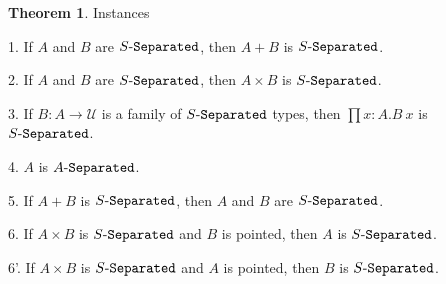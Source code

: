 \documentclass[11pt]{article}
\theoremstyle{definition}
\newtheorem{theorem}{Theorem}[section]
\renewcommand{\(}{\left(}
\renewcommand{\)}{\right)}
\newcommand{\U}{\mathcal{U}}
\newcommand{\apl}[2]{#1\ #2}
\newcommand{\dprod}[2]{\prod #1.#2}
\newcommand{\prodt}[2]{#1 \times #2}
\begin{document}
\begin{theorem} Instances

1. If $A$ and $B$ are $\Separated{S}$, then $A + B$ is $\Separated{S}$.

2. If $A$ and $B$ are $\Separated{S}$, then $\prodt{A}{B}$ is $\Separated{S}$.

3. If $B : A \to \U$ is a family of $\Separated{S}$ types, then $\dprod{x : A}{\apl{B}{x}}$ is $\Separated{S}$.

4. $A$ is $\Separated{A}$.

5. If $A + B$ is $\Separated{S}$, then $A$ and $B$ are $\Separated{S}$.

6. If $\prodt{A}{B}$ is $\Separated{S}$ and $B$ is pointed, then $A$ is $\Separated{S}$.

6'. If $\prodt{A}{B}$ is $\Separated{S}$ and $A$ is pointed, then $B$ is $\Separated{S}$.

\end{theorem}
\end{document}
